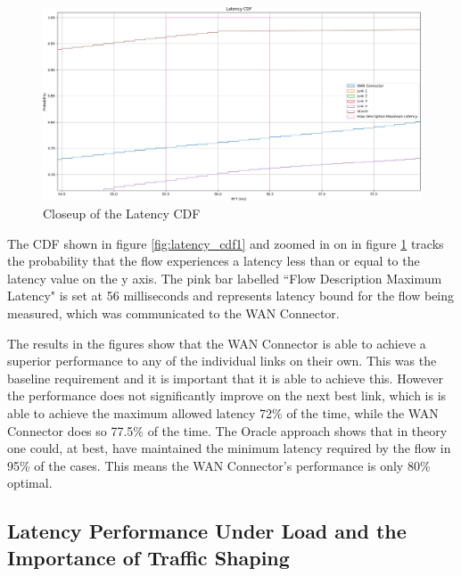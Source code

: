 \begin{figure}[h]
    \centering
        \includegraphics[height=0.66\textwidth,width=\textwidth]{fig/latency_cdf1_super_zoomed_in.png}
        \caption{Closeup of the Latency CDF}
        \label{fig:latency_cdf1_super_zoomed_in}
\end{figure}

The CDF shown in figure \ref{fig:latency_cdf1} and zoomed in on in figure \ref{fig:latency_cdf1_super_zoomed_in} tracks the probability that the flow experiences a latency less than or equal to the latency value on the y axis. The pink bar labelled “Flow Description Maximum Latency" is set at 56 milliseconds and represents latency bound for the flow being measured, which was communicated to the WAN Connector.


The results in the figures show that the WAN Connector is able to achieve a superior performance to any of the individual links on their own. This was the baseline requirement and it is important that it is able to achieve this. However the performance does not significantly improve on the next best link, which is is able to achieve the maximum allowed latency 72\% of the time, while the WAN Connector does so 77.5\% of the time. The Oracle approach shows that in theory one could, at best, have maintained the minimum latency required by the flow in 95\% of the cases. This means the WAN Connector's performance is only 80\% optimal.


\subsection{Latency Performance Under Load and the Importance of Traffic Shaping}

